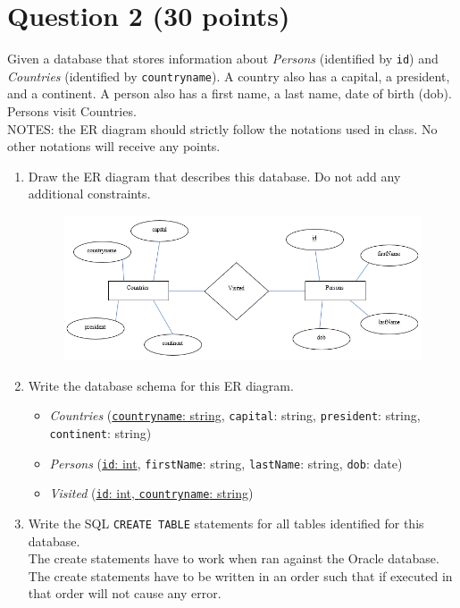 \documentclass[letterpaper, 11pt]{article}
\begin{document}
\section*{Question 2 (30 points)}

Given a database that stores information about \textit{Persons} (identified by \texttt{id}) and \textit{Countries} (identified by \texttt{countryname}). A country also has a capital, a president, and a continent. A person also has a first name, a last name, date of birth (dob). Persons visit Countries.\\
NOTES: the ER diagram should strictly follow the notations used in class. No other notations will receive any points.

\begin{enumerate}[label={\alph*})]
    \item Draw the ER diagram that describes this database. Do not add any additional constraints.
    \begin{figure}[H]
        \centering
        \includegraphics[scale=0.7]{hw2-2a.png}
    \end{figure}
    \item Write the database schema for this ER diagram.

    \begin{itemize}
        \item \textit{Countries} (\underline{\texttt{countryname}: string}, \texttt{capital}: string, \texttt{president}: string, \texttt{continent}: string)
        \item \textit{Persons} (\underline{\texttt{id}: int}, \texttt{firstName}: string, \texttt{lastName}: string, \texttt{dob}: date)
        \item \textit{Visited} (\underline{\texttt{id}: int, \texttt{countryname}: string})
    \end{itemize}
    
    \item Write the SQL \texttt{CREATE TABLE} statements for all tables identified for this database.\\
    The create statements have to work when ran against the Oracle database.\\
    The create statements have to be written in an order such that if executed in that order will not cause any error.


\end{enumerate}
\end{document}
